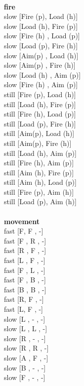 \noindent 

\ \\ {\bf fire } \\
slow [Fire (p), Load (h)] \\
slow [Load (h), Fire (p)] \\
slow [Fire (h) ,  Load (p)] \\
slow [Load (p), Fire (h)] \\
slow [Aim(p) ,  Load (h)] \\
slow [Aim(p) ,  Fire (h)] \\
slow [Load (h) ,  Aim (p)] \\
slow [Fire (h) ,  Aim (p)] \\
still [Fire (p), Load (h)] \\
still [Load (h), Fire (p)] \\
still [Fire (h), Load (p)] \\
still [Load (p), Fire (h)] \\
still [Aim(p), Load (h)] \\
still [Aim(p), Fire (h)] \\
still [Load (h), Aim (p)] \\
still [Fire (h), Aim (p)] \\
still [Aim (h), Fire (p)] \\
still [Aim (h), Load (p)] \\
still [Fire (p), Aim (h)] \\
still [Load (p), Aim (h)] \\
\ \\ {\bf movement } \\
fast [F,  F ,  -] \\
fast [F ,  R ,  -] \\
fast [R ,  F ,  -] \\
fast [L ,  F ,  -] \\
fast [F ,  L ,  -] \\
fast [F ,  B ,  -] \\
fast [B ,  B ,  -] \\
fast [R,  F ,  -] \\
fast [L,  F ,  -] \\
slow [L ,  - ,  -] \\
slow [L ,  L ,  -] \\
slow [R ,  - ,  -] \\
slow [R ,  R ,  -] \\
slow [A ,  F ,  -] \\
slow [B ,  - ,  -] \\
slow [F ,  - ,  -] \\
